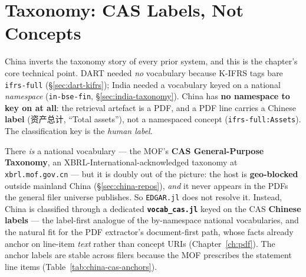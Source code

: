 \documentclass[11pt,a4paper]{report}
\newcommand{\cncjk}[2]{{\cjkCNfont #1}}
\begin{document}
\section{Taxonomy: CAS Labels, Not Concepts}\label{sec:china-taxonomy}

China inverts the taxonomy story of every prior system, and this is the chapter's core technical point.
DART needed \emph{no} vocabulary because K-IFRS tags bare \texttt{ifrs-full} (\S\ref{sec:dart-kifrs}); India
needed a vocabulary keyed on a national \emph{namespace} (\texttt{in-bse-fin}, \S\ref{sec:india-taxonomy}).
China has \textbf{no namespace to key on at all}: the retrieval artefact is a PDF, and a PDF line carries a
Chinese \textbf{label} (\cncjk{资产总计}{}, ``Total assets''), not a namespaced concept
(\texttt{ifrs-full:Assets}). The classification key is the \emph{human label}.

There \emph{is} a national vocabulary --- the MOF's \textbf{CAS General-Purpose Taxonomy}, an
XBRL-International-acknowledged taxonomy at
\texttt{xbrl.mof.gov.cn} --- but it is doubly out of the picture: the host is \textbf{geo-blocked} outside
mainland China (\S\ref{sec:china-repos}), \emph{and} it never appears in the PDFs the general filer universe
publishes. So \texttt{EDGAR.jl} does not resolve it. Instead, China is classified through a dedicated
\textbf{\texttt{vocab\_cas.jl}} keyed on the CAS \textbf{Chinese labels} --- the label-first analogue of the
by-namespace national vocabularies, and the natural fit for the PDF extractor's document-first path, whose
facts already anchor on line-item \emph{text} rather than concept URIs (Chapter~\ref{ch:pdf}). The anchor
labels are stable across filers because the MOF prescribes the statement line items
(Table~\ref{tab:china-cas-anchors}).
\end{document}

